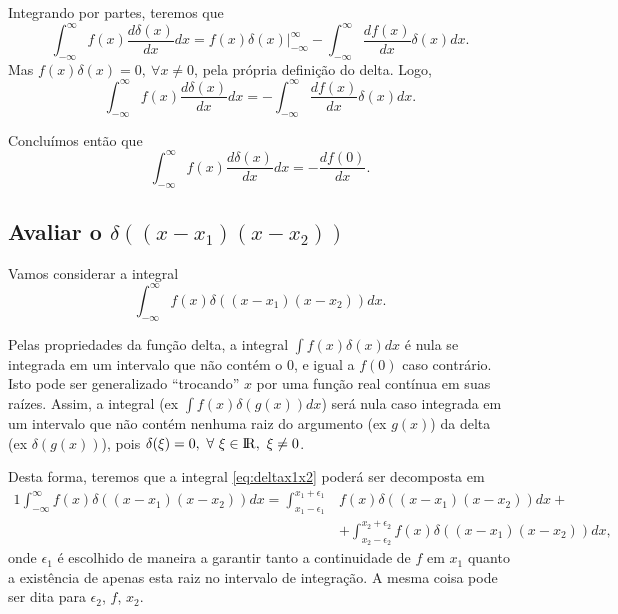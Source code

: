\documentclass{article}
\newcommand{\reais}{{\rm I\!R}}
\begin{document}
Integrando por partes, teremos que
\begin{equation}
 \int_{-\infty}^{\infty} f(x)\frac{d\delta(x)}{dx} dx = \left. f(x)\delta(x)\right|_{-\infty}^{\infty} - \int_{-\infty}^{\infty} \frac{df(x)}{dx}\delta(x) dx.
\end{equation}
Mas $f(x)\delta(x) = 0,\ \forall x \neq 0$, pela própria definição do delta. Logo,
\begin{equation}
 \int_{-\infty}^{\infty} f(x)\frac{d\delta(x)}{dx} dx = - \int_{-\infty}^{\infty} \frac{df(x)}{dx}\delta(x) dx.
\end{equation}

Concluímos então que
\begin{equation}
 \int_{-\infty}^{\infty} f(x)\frac{d\delta(x)}{dx} dx = - \frac{df(0)}{dx}.
\end{equation}

\subsection{Avaliar o $\delta((x-x_1)(x-x_2))$}
Vamos considerar a integral
\begin{equation}\label{eq:deltax1x2}
 \int_{-\infty}^{\infty} f(x)\delta((x-x_1)(x-x_2)) dx.
\end{equation}

Pelas propriedades da função delta, a integral $\int f(x)\delta(x)dx$ é nula se integrada em um intervalo que não contém o $0$, e igual a $f(0)$ caso contrário. Isto pode
ser generalizado ``trocando'' $x$ por uma função real contínua em suas raízes. Assim, a integral (ex $\int f(x)\delta(g(x))dx$) será nula caso integrada em um intervalo
que não contém nenhuma raiz do argumento (ex $g(x)$) da delta (ex $\delta(g(x))$), pois $\delta{(\xi)} = 0,\ \forall\ \xi \in \reais,\ \xi \neq 0$.

Desta forma, teremos que a integral \eqref{eq:deltax1x2} poderá ser decomposta em
\begin{alignat}{1}
\nonumber
 \int_{-\infty}^{\infty} f(x)\delta((x-x_1)(x-x_2)) dx = \int_{x_1 - \epsilon_1}^{x_1 + \epsilon_1} &f(x)\delta((x-x_1)(x-x_2)) dx +\\
 &+ \int_{x_2 - \epsilon_2}^{x_2 + \epsilon_2} f(x)\delta((x-x_1)(x-x_2)) dx,\label{eq:somadeltapartes}
\end{alignat}
onde $\epsilon_1$ é escolhido de maneira a garantir tanto a continuidade de $f$ em $x_1$ quanto a existência de apenas esta raiz no intervalo de integração. A mesma coisa
pode ser dita para $\epsilon_2$, $f$, $x_2$.
\end{document}

